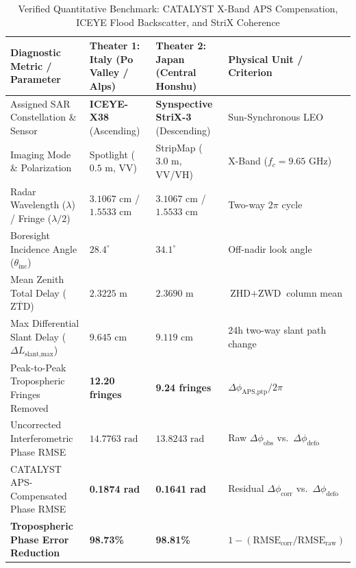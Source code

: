 \documentclass[10pt,twocolumn,letterpaper]{article}
\begin{document}
\begin{table}[t]
\centering
\footnotesize
\setlength{\tabcolsep}{4.5pt}
\caption{Verified Quantitative Benchmark: CATALYST X-Band APS Compensation, ICEYE Flood Backscatter, and StriX Coherence}
\label{tab:sar_metrics}
\vspace{0.1cm}
\begin{tabularx}{\textwidth}{>{\raggedright\arraybackslash}X >{\centering\arraybackslash}p{3.4cm} >{\centering\arraybackslash}p{3.4cm} >{\raggedright\arraybackslash}p{3.9cm}}
\toprule
\textbf{Diagnostic Metric / Parameter} & \textbf{Theater 1: Italy} \newline \textbf{(Po Valley / Alps)} & \textbf{Theater 2: Japan} \newline \textbf{(Central Honshu)} & \textbf{Physical Unit / Criterion} \\
\midrule
Assigned SAR Constellation \& Sensor & \textbf{ICEYE-X38} (Ascending) & \textbf{Synspective StriX-3} (Descending) & Sun-Synchronous LEO \\
Imaging Mode \& Polarization & Spotlight ($0.5\text{ m}$, VV) & StripMap ($3.0\text{ m}$, VV/VH) & X-Band ($f_c = 9.65\text{ GHz}$) \\
Radar Wavelength ($\lambda$) / Fringe ($\lambda/2$) & $3.1067\text{ cm}$ / $1.5533\text{ cm}$ & $3.1067\text{ cm}$ / $1.5533\text{ cm}$ & Two-way $2\pi$ cycle \\
Boresight Incidence Angle ($\theta_{\text{inc}}$) & $28.4^\circ$ & $34.1^\circ$ & Off-nadir look angle \\
Mean Zenith Total Delay ($\overline{\text{ZTD}}$) & $2.3225\text{ m}$ & $2.3690\text{ m}$ & $\text{ZHD} + \text{ZWD}$ column mean \\
Max Differential Slant Delay ($\Delta L_{\text{slant,max}}$) & $9.645\text{ cm}$ & $9.119\text{ cm}$ & 24h two-way slant path change \\
Peak-to-Peak Tropospheric Fringes Removed & \textbf{12.20 fringes} & \textbf{9.24 fringes} & $\Delta\phi_{\text{APS,ptp}} / 2\pi$ \\
Uncorrected Interferometric Phase RMSE & $14.7763\text{ rad}$ & $13.8243\text{ rad}$ & Raw $\Delta\phi_{\text{obs}}$ vs.\ $\Delta\phi_{\text{defo}}$ \\
CATALYST APS-Compensated Phase RMSE & \textbf{0.1874 rad} & \textbf{0.1641 rad} & Residual $\Delta\phi_{\text{corr}}$ vs.\ $\Delta\phi_{\text{defo}}$ \\
\textbf{Tropospheric Phase Error Reduction} & \textbf{98.73\%} & \textbf{98.81\%} & $1 - (\text{RMSE}_{\text{corr}} / \text{RMSE}_{\text{raw}})$ \\

\end{tabularx}
\end{table}
\end{document}

